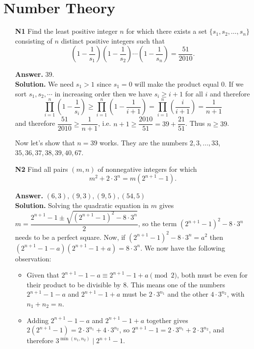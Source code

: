 \documentclass[12pt]{article}
\newcommand{\<}{\langle}
\renewcommand{\>}{\rangle}
\begin{document}
\section*{Number Theory}
\begin{enumerate}
	\item [\textbf{N1}] Find the least positive integer $n$ for which there exists a set $\{s_1, s_2, \ldots , s_n\}$ consisting of $n$ distinct positive integers such that
	\[ \left( 1 - \frac{1}{s_1} \right) \left( 1 - \frac{1}{s_2} \right) \cdots \left( 1 - \frac{1}{s_n} \right) = \frac{51}{2010}.\]
	
	\textbf{Answer.} 39. \\
	\textbf{Solution.} We need $s_1>1$ since $s_1=0$ will make the product equal 0. If we sort $s_1, s_2, \cdots$ in increasing order then we have $s_i\ge i+1$ for all $i$ and therefore 
	\[
	\displaystyle\prod_{i=1}^n \left(1-\frac {1}{s_i}\right)
	\ge \displaystyle\prod_{i=1}^n\left(1-\frac {1}{i+1}\right)
	=\displaystyle\prod_{i=1}^n\left(\frac {i}{i+1}\right)
	=\dfrac{1}{n+1}
	\]
	and therefore $\dfrac{51}{2010}\ge \dfrac{1}{n+1}$, i.e. $n+1\ge \dfrac{2010}{51}=39+\dfrac{21}{51}$. Thus $n\ge 39$. 
	
	Now let's show that $n=39$ works. They are the numbers $2, 3, ..., 33$, $35, 36, 37, 38, 39, 40, 67$. 
	
	\item [\textbf{N2}] Find all pairs $(m,n)$ of nonnegative integers for which \[m^2 + 2 \cdot 3^n = m\left(2^{n+1} - 1\right).\]
	
	\textbf{Answer.} $(6, 3), (9, 3), (9, 5), (54, 5)$\\
	\textbf{Solution.} Solving the quadratic equation in $m$ gives $m=\dfrac{2^{n+1}-1 \pm \sqrt{(2^{n+1}-1)^2 - 8\cdot 3^n}}{2}$, so the term $(2^{n+1}-1)^2 - 8\cdot 3^n$ needs to be a perfect square. Now, if $(2^{n+1}-1)^2 - 8\cdot 3^n = a^2$ then $(2^{n+1}-1-a)(2^{n+1}-1+a)=8\cdot 3^n$. We now have the following observation: 
	
	\begin{itemize}
		\item Given that $2^{n+1}-1-a\equiv 2^{n+1}-1+a\pmod{2}$, both must be even for their product to be divisible by 8. This means one of the numbers $2^{n+1}-1-a$ and $2^{n+1}-1+a$ must be $2\cdot 3^{n_1}$ and the other $4\cdot 3^{n_2}$, with $n_1+n_2=n$. 
		
		\item Adding $2^{n+1}-1-a$ and $2^{n+1}-1+a$ together gives $2(2^{n+1}-1)=2\cdot 3^{n_1}+4\cdot 3^{n_2}$, so $2^{n+1}-1=2\cdot 3^{n_1}+2\cdot 3^{n_2}$, and therefore $3^{\min(n_1, n_2)}\mid 2^{n+1}-1$. 
	\end{itemize}
	

\end{enumerate}
\end{document}
